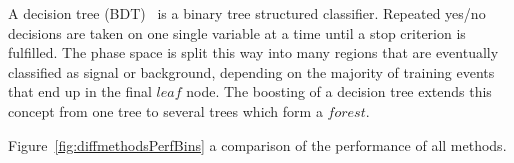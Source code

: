 A decision tree (BDT)~\cite{QUINLAN1999497} is a binary tree structured classifier. Repeated yes/no decisions are taken on one single variable at a time until a stop criterion is fulfilled.  The phase space is split this way into many regions that are eventually classified as signal or background, depending on the majority of training events that end up in the final $leaf$ node. The boosting of a decision tree extends this concept from one tree to several trees which form a $forest$.





Figure~\ref{fig:diffmethodsPerfBins} a comparison of the performance of all methods.

